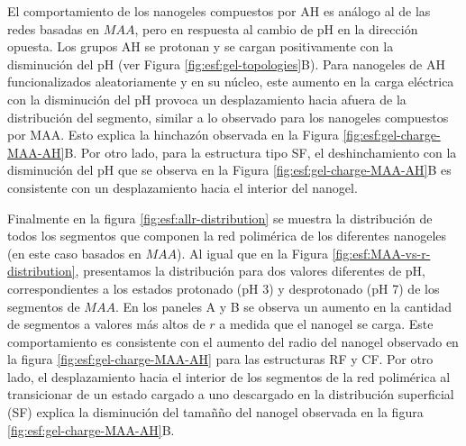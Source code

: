 El comportamiento de los nanogeles compuestos por AH es an\'alogo al de las redes basadas en $MAA$, pero en respuesta al cambio de pH en la direcci\'on opuesta. Los grupos AH se protonan y se cargan positivamente con la disminuci\'on del pH (ver Figura \ref{fig:esf:gel-topologies}B). Para nanogeles de AH funcionalizados aleatoriamente y en su n\'ucleo, este aumento en la carga el\'ectrica con la disminuci\'on del pH provoca un desplazamiento hacia afuera de la distribuci\'on del segmento, similar a lo observado para los nanogeles compuestos por MAA. Esto explica la hinchaz\'on observada en la Figura \ref{fig:esf:gel-charge-MAA-AH}B. Por otro lado, para la estructura tipo SF, el deshinchamiento con la disminuci\'on del pH que se observa en la Figura \ref{fig:esf:gel-charge-MAA-AH}B es consistente con un desplazamiento hacia el interior del nanogel.%

Finalmente en la figura \ref{fig:esf:allr-distribution} se muestra la distribuci\'on de todos los segmentos que componen la red polim\'erica de los diferentes nanogeles (en este caso basados en $MAA$). Al igual que en la Figura \ref{fig:esf:MAA-vs-r-distribution}, presentamos la distribuci\'on para dos valores diferentes de pH, correspondientes a los estados protonado (pH 3) y desprotonado (pH 7) de los segmentos de $MAA$. En los paneles A y B se observa un aumento en la cantidad de segmentos a valores m\'as altos de $r$ a medida que el nanogel se carga. Este comportamiento es consistente con el aumento del radio del nanogel observado en la figura \ref{fig:esf:gel-charge-MAA-AH} para las estructuras RF y CF. Por otro lado, el desplazamiento hacia el interior de los segmentos de la red polim\'erica al transicionar de un estado cargado a uno descargado en la distribuci\'on superficial (SF) explica la disminuci\'on del tamañ\~no del nanogel observada en la figura \ref{fig:esf:gel-charge-MAA-AH}B.

